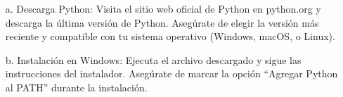 \begin{itemize}
    \item[a. ]Descarga Python: Visita el sitio web oficial de Python en python.org y descarga la última versión de Python. Asegúrate de elegir la versión más reciente y compatible con tu sistema operativo (Windows, macOS, o Linux).
    \begin{figure}[h]
        \centering
      \end{figure}
    
    \item[b. ]Instalación en Windows: Ejecuta el archivo descargado y sigue las instrucciones del instalador. Asegúrate de marcar la opción ``Agregar Python al PATH'' durante la instalación.
    \begin{figure}[h]
        \centering
      \end{figure}
\end{itemize}


